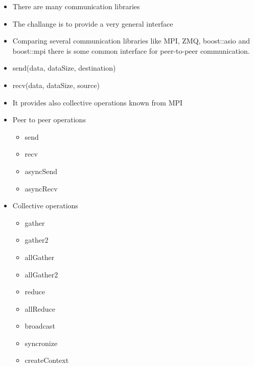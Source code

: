 \begin{itemize}
\item There are many communication libraries
\item The challange is to provide a very general interface
\item Comparing several communication libraries like MPI, ZMQ,
  boost::asio and boost::mpi there is some common interface for
  peer-to-peer communication.
\item send(data, dataSize, destination)
\item recv(data, dataSize, source)
\item It provides also collective operations known from MPI
\end{itemize}

\begin{itemize}
\item Peer to peer operations
  \begin{itemize}
  \item send
  \item recv
  \item asyncSend
  \item asyncRecv
  \end{itemize}
\end{itemize}

\begin{itemize}
\item Collective operations
  \begin{itemize}
    \item gather
    \item gather2
    \item allGather
    \item allGather2
    \item reduce
    \item allReduce
    \item broadcast
    \item syncronize
    \item createContext
  \end{itemize}

\end{itemize}

